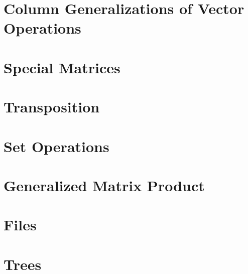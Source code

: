 \section{Column Generalizations of Vector Operations}


\section{Special Matrices}


\section{Transposition}


\section{Set Operations}


\section{Generalized Matrix Product}


\section{Files}


\section{Trees}

